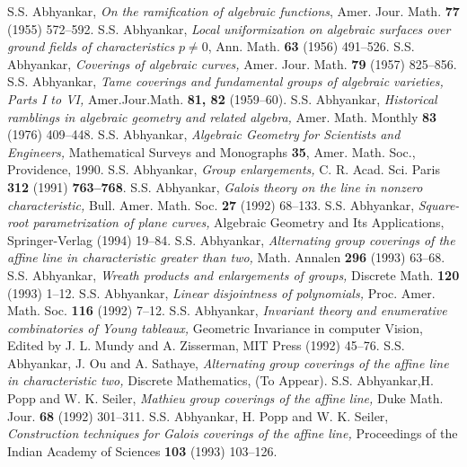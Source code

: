 \begin{thebibliography}{99}
\pageoriginale
{} S.S. Abhyankar, \textit{On the ramification of algebraic functions}, Amer. Jour. Math. {\bf 77} (1955) 572--592.
 S.S. Abhyankar, \textit{Local uniformization on algebraic surfaces over ground fields of characteristics} $p\neq 0$, Ann. Math. {\bf 63} (1956) 491--526.
 S.S. Abhyankar, \textit{Coverings of algebraic curves,} Amer. Jour. Math. {\bf 79} (1957) 825--856.
 S.S. Abhyankar, \textit{Tame coverings and fundamental groups of algebraic varieties, Parts I to VI,} Amer.Jour.Math. {\bf 81, 82} (1959--60).
 S.S. Abhyankar, \textit{Historical ramblings in algebraic geometry and related algebra,} Amer. Math. Monthly {\bf 83} (1976) 409--448.
 S.S. Abhyankar, \textit{Algebraic Geometry for Scientists and Engineers,} Mathematical Surveys and Monographs {\bf 35}, Amer. Math. Soc., Providence, 1990.
 S.S. Abhyankar, \textit{Group enlargements,} C. R. Acad. Sci. Paris {\bf 312} (1991) {\bf 763--768}.
 S.S. Abhyankar, \textit{Galois theory on the line in nonzero characteristic,} Bull. Amer. Math. Soc. {\bf 27} (1992) 68--133.
 S.S. Abhyankar, \textit{Square-root parametrization of plane curves,} Algebraic Geometry and Its Applications, Springer-Verlag (1994) 19--84.
 S.S. Abhyankar, \textit{Alternating group coverings of the affine line in characteristic greater than two,} Math. Annalen {\bf 296} (1993) 63--68.
 S.S. Abhyankar, \textit{Wreath products and enlargements of groups,} Discrete Math. {\bf 120} (1993) 1--12.
 S.S. Abhyankar, \textit{Linear disjointness of polynomials,} Proc. Amer. Math. Soc. {\bf 116} (1992) 7--12.
 S.S. Abhyankar, \textit{Invariant theory and enumerative combinatories of Young tableaux,} Geometric Invariance in computer Vision, Edited by J. L. Mundy and A. Zisserman, MIT Press (1992) 45--76.
 S.S. Abhyankar, J. Ou and A. Sathaye, \textit{Alternating group coverings of the affine line in characteristic two,} Discrete Mathematics, (To Appear).
 S.S. Abhyankar,\pageoriginale H. Popp and W. K. Seiler, \textit{Mathieu group coverings of the affine line,} Duke Math. Jour. {\bf 68} (1992) 301--311.
 S.S. Abhyankar, H. Popp and W. K. Seiler, \textit{Construction techniques for Galois coverings of the affine line,} Proceedings of the Indian Academy of Sciences {\bf 103} (1993) 103--126.

\end{thebibliography}
